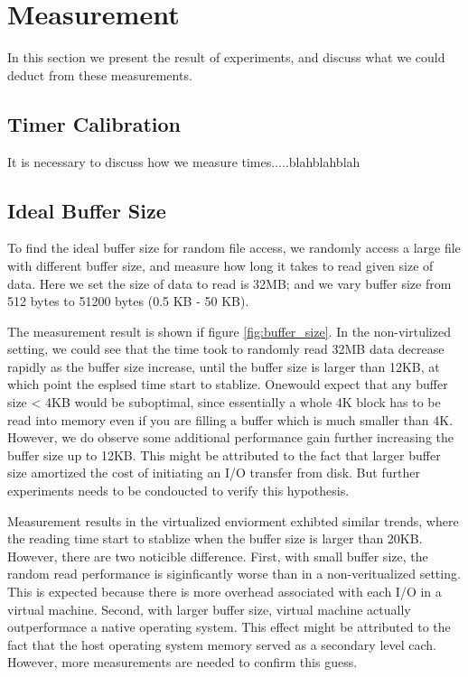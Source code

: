 \section{Measurement}
\label{section:measurement}

In this section we present the result of experiments, and discuss what we could deduct from these measurements.

\subsection{Timer Calibration}
It is necessary to discuss how we measure times.....blahblahblah

\subsection{Ideal Buffer Size}
To find the ideal buffer size for random file access, we randomly access a large file with different buffer size, and measure how long it takes to read given size of data. Here we set the size of data to read is 32MB; and we vary buffer size from 512 bytes to 51200 bytes (0.5 KB - 50 KB). 

The measurement result is shown if figure \ref{fig:buffer_size}. In the non-virtulized setting, we could see that the time took to randomly read 32MB data decrease rapidly as the buffer size increase, until the buffer size is larger than 12KB, at which point the esplsed time start to stablize. Onewould expect that any buffer size < 4KB would be suboptimal, since essentially a whole 4K block has to be read into memory even if you are filling a buffer which is much smaller than 4K. However, we do observe some additional performance gain further increasing the buffer size up to 12KB. This might be attributed to the fact that larger buffer size amortized the cost of initiating an I/O transfer from disk. But further experiments needs to be condoucted to verify this hypothesis. 

Measurement results in the virtualized enviorment exhibted similar trends, where the reading time start to stablize when the buffer size is larger than 20KB. However, there are two noticible difference. First, with small buffer size, the random read performance is siginficantly worse than in a non-veritualized setting. This is expected because there is more overhead associated with each I/O in a virtual machine. Second, with larger buffer size, virtual machine actually outperformace a native operating system. This effect might be attributed to the fact that the host operating system memory served as a secondary level cach. However, more measurements are needed to confirm this guess. 

